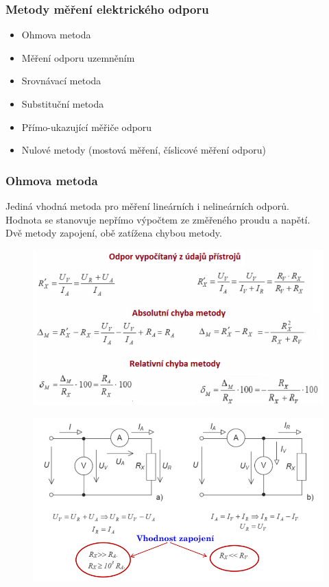 \subsubsection{Metody měření elektrického odporu}
\begin{itemize}
    \item Ohmova metoda
    \item Měření odporu uzemněním
    \item Srovnávací metoda
    \item Substituční metoda
    \item Přímo-ukazující měřiče odporu
    \item Nulové metody (mostová měření, číslicové měření odporu)
\end{itemize}

\subsubsection{Ohmova metoda}
Jediná vhodná metoda pro měření lineárních i nelineárních odporů.\\
Hodnota se stanovuje nepřímo výpočtem ze změřeného proudu a napětí.\\
Dvě metody zapojení, obě zatížena chybou metody.\\
\begin{figure}[h!]
    \centering
    \includegraphics[scale = 0.5]{images/Ohm1.png}
\end{figure}
\begin{figure}[h!]
    \centering
    \includegraphics[scale = 0.5]{images/Ohm2.png}
\end{figure}

